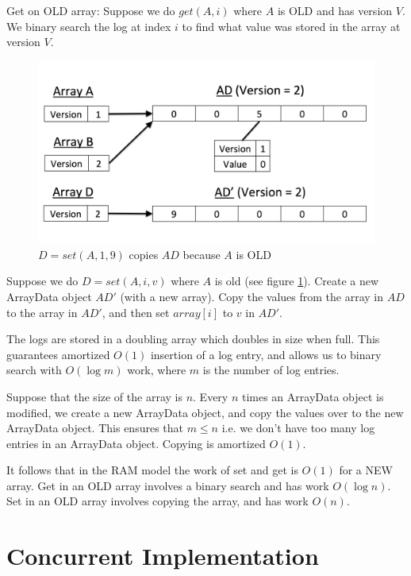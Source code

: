 \documentclass[preprint]{sigplanconf}
\begin{document}
Get on OLD array: Suppose we do $get(A, i)$ where $A$ is OLD and has version $V$. We binary search the log at index $i$ to find what value was stored in the array at version $V$.

\begin{figure}[!ht]
\centering
\includegraphics[scale=0.3]{set_old_array}
\nocaptionrule \caption{$D = set(A, 1, 9)$ copies $AD$ because $A$ is OLD}
\label{fig:set_old_array}
\end{figure}

Suppose we do $D = set(A, i,v)$ where $A$ is old (see figure \ref{fig:set_old_array}). Create a new ArrayData object $AD'$ (with a new array). Copy the values from the array in $AD$ to the array in $AD'$, and then set $array[i]$ to $v$ in $AD'$.

The logs are stored in a doubling array which doubles in size when full. This guarantees amortized $O(1)$ insertion of a log entry, and allows us to binary search with $O(\log{m})$ work, where $m$ is the number of log entries.

Suppose that the size of the array is $n$. Every $n$ times an ArrayData object is modified, we create a new ArrayData object, and copy the values over to the new ArrayData object. This ensures that $m \leq n$ i.e. we don't have too many log entries in an ArrayData object. Copying is amortized $O(1)$.

It follows that in the RAM model the work of set and get is $O(1)$ for a NEW array. Get in an OLD array involves a binary search and has work $O(\log{n})$. Set in an OLD array involves copying the array, and has work $O(n)$.

\section{Concurrent Implementation}
\end{document}
